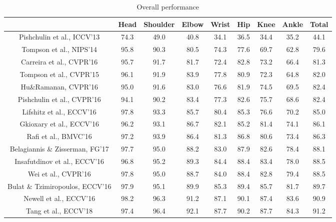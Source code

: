 \begin{table}[htbp]
\caption{Overall performance}
\label{performance}
\vspace{0.5em}\centering\wuhao
\begin{tabular}{ccccccccc}
\toprule[1.5pt]
&Head & Shoulder & Elbow & Wrist & Hip & Knee  & Ankle & Total\\
\midrule[1pt]
Pishchulin et al., ICCV'13\cite{pishchulin2013strong}& 74.3  & 49.0  & 40.8  & 34.1  & 36.5  & 34.4 & 35.2 & 44.1\\
Tompson et al., NIPS'14\cite{tompson2014joint}& 95.8  & 90.3  & 80.5  & 74.3  & 77.6  & 69.7 & 62.8 & 79.6\\
Carreira et al., CVPR'16\cite{carreira2016human}& 95.7  & 91.7  & 81.7  & 72.4  & 82.8  & 73.2 & 66.4 & 81.3\\
Tompson et al., CVPR'15\cite{tompson2015efficient}& 96.1  & 91.9  & 83.9  & 77.8  & 80.9  & 72.3 & 64.8 & 82.0\\
Hu\&Ramanan, CVPR'16\cite{hu2016bottom}& 95.0  & 91.6  & 83.0  & 76.6  & 81.9  & 74.5 & 69.5 & 82.4\\
Pishchulin et al., CVPR'16\cite{pishchulin16cvpr}& 94.1  & 90.2  & 83.4  & 77.3  & 82.6  & 75.7 & 68.6 & 82.4\\
Lifshitz et al., ECCV'16\cite{lifshitz2016human}& 97.8  & 93.3  & 85.7  & 80.4  & 85.3  & 76.6 & 70.2 & 85.0\\
Gkioxary et al., ECCV'16\cite{chain16}& 96.2  & 93.1  & 86.7  & 82.1  & 85.2  & 81.4 & 74.1 & 86.1\\
Rafi et al., BMVC'16\cite{rafi2016efficient}& 97.2  & 93.9  & 86.4  & 81.3  & 86.8  & 80.6 & 73.4 & 86.3\\
Belagiannis \& Zisserman, FG'17\cite{belagiannis2017recurrent}& 97.7  & 95.0  & 88.2  & 83.0  & 87.9  & 82.6 & 78.4 & 88.1\\
Insafutdinov et al., ECCV'16\cite{insafutdinov16ariv}& 96.8  & 95.2  & 89.3  & 84.4  & 88.4  & 83.4 & 78.0 & 88.5\\
Wei et al., CVPR'16\cite{wei2016convolutional}& 97.8  & 95.0  & 88.7  & 84.0  & 88.4  & 82.8 & 79.4 & 88.5\\
Bulat \& Tzimiropoulos, ECCV'16\cite{bulat2016human}& 97.9  & 95.1  & 89.9  & 85.3  & 89.4  & 85.7 & 81.7 & 89.7\\
Newell et al., ECCV'16\cite{newell2016stacked}& 98.2  & 96.3  & 91.2  & 87.1  & 90.1  & 87.4 & 83.6 & 90.9\\
Tang et al., ECCV'18\cite{tang2018quantized}& 97.4  & 96.4  & 92.1  & 87.7  & 90.2  & 87.7 & 84.3 & 91.2\\

\end{tabular}
\end{table}
